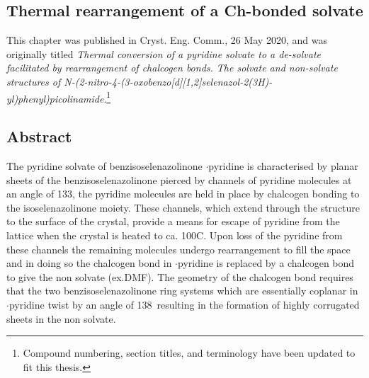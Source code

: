 \begin{refsection}

    
    \chapter{Thermal rearrangement of a Ch-bonded solvate}\label{sec:thermal-conversion}
    
    This chapter was published in Cryst. Eng. Comm., 26 May 2020, and was originally titled \emph{Thermal conversion of a pyridine solvate to a de-solvate facilitated by rearrangement of chalcogen bonds. The solvate and non-solvate structures of N-(2-nitro-4-(3-oxobenzo[\emph{d}][1,2]selenazol-2(3\emph{H})-yl)phenyl)picolinamide}\autocite{Fellowes2020a}.\footnote{Compound numbering, section titles, and terminology have been updated to fit this thesis.}
    
    \section{Abstract}
    The pyridine solvate of benzisoselenazolinone $\cdot$pyridine is characterised by planar sheets of the benzisoselenazolinone  pierced by channels of pyridine molecules at an angle of 133\degree, the pyridine molecules are held in place by  chalcogen bonding to the isoselenazolinone moiety.
    These channels, which extend through the structure to the surface of the crystal, provide a means for escape of pyridine from the lattice when the crystal is heated to ca. 100\degree{}C.
    Upon loss of the pyridine from these channels the remaining molecules undergo rearrangement to fill the space and in doing so the  chalcogen bond in $\cdot$pyridine is replaced by a  chalcogen bond to give the non solvate (ex.DMF).
    The geometry of the chalcogen bond requires that the two benzisoselenazolinone ring systems which are essentially coplanar in $\cdot$pyridine twist by an angle of 138\degree~resulting in the formation of highly corrugated sheets in the non solvate.
    

\end{refsection}
